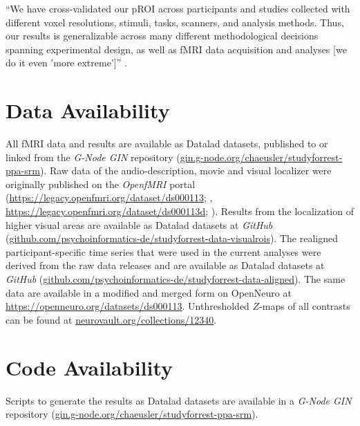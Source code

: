 ``We have cross-validated our pROI across participants and studies collected
with different voxel resolutions, stimuli, tasks, scanners, and analysis
methods.
%
Thus, our results is generalizable across many different methodological
decisions spanning experimental design, as well as fMRI data acquisition and
analyses [we do it even 'more extreme']'' \citep{weiner2018defining}.


\section{Data Availability}



All fMRI data and results are available as Datalad \citep{halchenko2021datalad}
datasets, published to or linked from the \emph{G-Node GIN} repository
(\href{https://gin.g-node.org/chaeusler/studyforrest-ppa-srm}{\url{gin.g-node.org/chaeusler/studyforrest-ppa-srm}}).
Raw data of the audio-description, movie and visual localizer were originally
published on the \emph{OpenfMRI} portal
(\url{https://legacy.openfmri.org/dataset/ds000113}; \citep{Hanke2014ds000113},
\space \url{https://legacy.openfmri.org/dataset/ds000113d};
\citep{hanke2016ds000113d}).
Results from the localization of higher visual areas are available as Datalad
datasets at \emph{GitHub}
(\href{https://github.com/psychoinformatics-de/studyforrest-data-visualrois}{\url{github.com/psychoinformatics-de/studyforrest-data-visualrois}}).
The realigned participant-specific time series that were used in the current
analyses were derived from the raw data releases and are available as Datalad
datasets at \emph{GitHub}
(\href{https://github.com/psychoinformatics-de/studyforrest-data-aligned}{\url{github.com/psychoinformatics-de/studyforrest-data-aligned}}).
The same data are available in a modified and merged form on OpenNeuro at
\url{https://openneuro.org/datasets/ds000113}.
Unthresholded $Z$-maps of all contrasts can be found at
\href{https://identifiers.org/neurovault.collection:12340}{\url{neurovault.org/collections/12340}}.


\section*{Code Availability}

Scripts to generate the results as Datalad \citep{halchenko2021datalad} datasets
are available in a \emph{G-Node GIN} repository
(\href{https://gin.g-node.org/chaeusler/studyforrest-ppa-srm}{\url{gin.g-node.org/chaeusler/studyforrest-ppa-srm}}).
